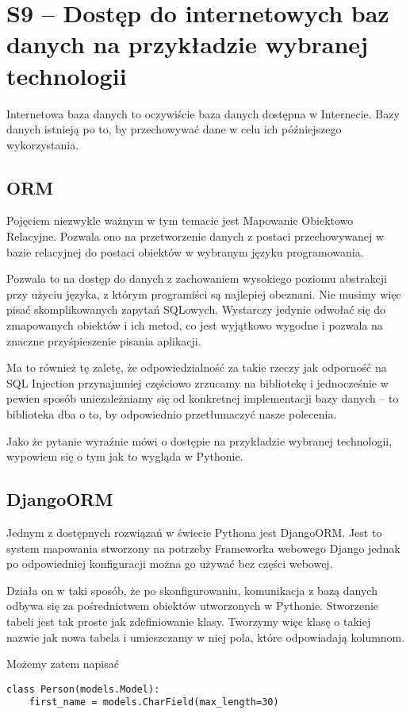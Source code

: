 \section{S9 -- Dostęp do internetowych baz danych na przykładzie wybranej technologii}
Internetowa baza danych to oczywiście baza danych dostępna w Internecie.
Bazy danych istnieją po to, by przechowywać dane w celu ich późniejszego wykorzystania.

\subsection{ORM}
Pojęciem niezwykle ważnym w tym temacie jest Mapowanie Obiektowo Relacyjne.
Pozwala ono na przetworzenie danych z postaci przechowywanej w bazie relacyjnej do postaci obiektów w wybranym języku programowania.

Pozwala to na dostęp do danych z zachowaniem wysokiego poziomu abstrakcji przy użyciu języka, z którym programiści są najlepiej obeznani.
Nie musimy więc pisać skomplikowanych zapytań SQLowych.
Wystarczy jedynie odwołać się do zmapowanych obiektów i ich metod, co jest wyjątkowo wygodne i pozwala na znaczne przyśpieszenie pisania aplikacji.

Ma to również tę zaletę, że odpowiedzialność za takie rzeczy jak odporność na SQL Injection przynajmniej częściowo zrzucamy na bibliotekę i jednocześnie w pewien sposób uniezależniamy się od konkretnej implementacji bazy danych -- to biblioteka dba o to, by odpowiednio przetłumaczyć nasze polecenia.

Jako że pytanie wyraźnie mówi o dostępie na przykładzie wybranej technologii, wypowiem się o tym jak to wygląda w Pythonie.

\subsection{DjangoORM}
Jednym z dostępnych rozwiązań w świecie Pythona jest DjangoORM.
Jest to system mapowania stworzony na potrzeby Frameworka webowego Django jednak po odpowiedniej konfiguracji można go używać bez części webowej.

Działa on w taki sposób, że po skonfigurowaniu, komunikacja z bazą danych odbywa się za pośrednictwem obiektów utworzonych w Pythonie.
Stworzenie tabeli jest tak proste jak zdefiniowanie klasy.
Tworzymy więc klasę o takiej nazwie jak nowa tabela i umieszczamy w niej pola, które odpowiadają kolumnom.

Możemy zatem napisać
\begin{lstlisting}
class Person(models.Model):
	first_name = models.CharField(max_length=30)
\end{lstlisting}

